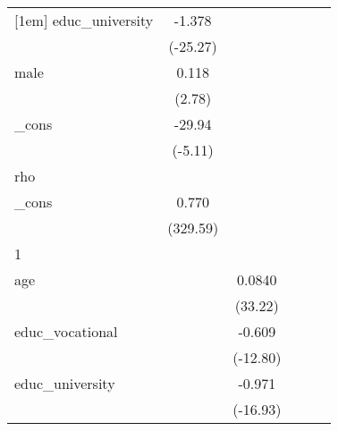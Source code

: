 {\begin{tabular}{l*{5}{c}}
[1em]
educ\_university&      -1.378\sym{***}&                     &                     &                     &                     \\
            &    (-25.27)         &                     &                     &                     &                     \\
[1em]
male        &       0.118\sym{**} &                     &                     &                     &                     \\
            &      (2.78)         &                     &                     &                     &                     \\
[1em]
\_cons      &      -29.94\sym{***}&                     &                     &                     &                     \\
            &     (-5.11)         &                     &                     &                     &                     \\
\hline
rho         &                     &                     &                     &                     &                     \\
\_cons      &       0.770\sym{***}&                     &                     &                     &                     \\
            &    (329.59)         &                     &                     &                     &                     \\
\hline
1           &                     &                     &                     &                     &                     \\
age         &                     &      0.0840\sym{***}&                     &                     &                     \\
            &                     &     (33.22)         &                     &                     &                     \\
[1em]
educ\_vocational&                     &      -0.609\sym{***}&                     &                     &                     \\
            &                     &    (-12.80)         &                     &                     &                     \\
[1em]
educ\_university&                     &      -0.971\sym{***}&                     &                     &                     \\
            &                     &    (-16.93)         &                     &                     &                     \\

\end{tabular}}
